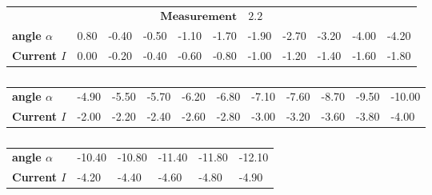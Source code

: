     \begin{table}[htdp]
        \begin{tabular}{|l||p{1.1cm}|p{1.1cm}|p{1.1cm}|p{1.1cm}|p{1.1cm}|p{1.1cm}|p{1.1cm}|p{1.1cm}|p{1.1cm}|p{1.1cm}|}
        \hline
            \multicolumn{11}{|c|}{\cellcolor[RGB]{206,250,201}$
            \mathbf{Measurement \quad 2.2}$} \\
\textbf{angle $\alpha$}& 0.80& -0.40& -0.50& -1.10& -1.70& -1.90& -2.70& -3.20& -4.00& -4.20 \\
\textbf{Current $I$}& 0.00& -0.20& -0.40& -0.60& -0.80& -1.00& -1.20& -1.40& -1.60& -1.80 \\

        \hline
        \end{tabular}
        \begin{tabular}{|l||p{1.1cm}|p{1.1cm}|p{1.1cm}|p{1.1cm}|p{1.1cm}|p{1.1cm}|p{1.1cm}|p{1.1cm}|p{1.1cm}|p{1.1cm}|}
        \hline\textbf{angle $\alpha$}& -4.90& -5.50& -5.70& -6.20& -6.80& -7.10& -7.60& -8.70& -9.50& -10.00 \\
\textbf{Current $I$}& -2.00& -2.20& -2.40& -2.60& -2.80& -3.00& -3.20& -3.60& -3.80& -4.00 \\

        \hline
        \end{tabular}
    \begin{tabular}{|l||p{1.1cm}|p{1.1cm}|p{1.1cm}|p{1.1cm}|p{1.1cm}|}
    \hline\textbf{angle $\alpha$}& -10.40& -10.80& -11.40& -11.80& -12.10 \\
\textbf{Current $I$}& -4.20& -4.40& -4.60& -4.80& -4.90 \\

    \hline
    \end{tabular}
    \caption{}
    \label{Power05}
    \end{table}

